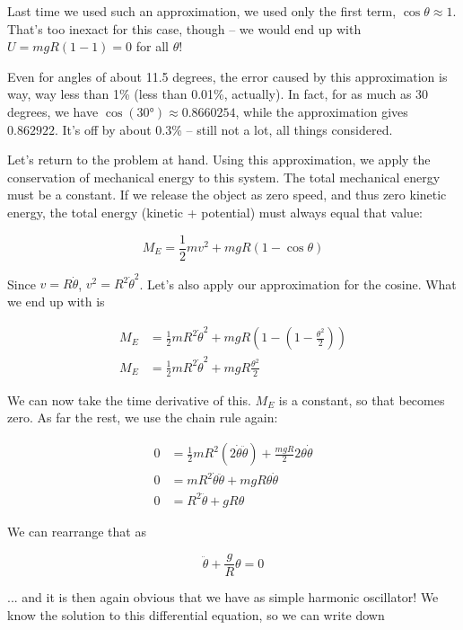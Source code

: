 Last time we used such an approximation, we used only the first term, $\cos \theta \approx 1$. That's too inexact for this case, though -- we would end up with $U = m g R (1 - 1) = 0$ for all $\theta$!

Even for angles of about 11.5 degrees, the error caused by this approximation is way, way less than 1\% (less than 0.01\%, actually). In fact, for as much as 30 degrees, we have $\cos(\ang{30}) \approx 0.8660254$, while the approximation gives $0.862922$. It's off by about 0.3\% -- still not a lot, all things considered.

Let's return to the problem at hand. Using this approximation, we apply the conservation of mechanical energy to this system. The total mechanical energy must be a constant. If we release the object as zero speed, and thus zero kinetic energy, the total energy (kinetic + potential) must always equal that value:

\begin{equation}
M_E = \frac{1}{2} m v^2 + m g R(1 - \cos \theta)
\end{equation}

Since $v = R \dot{\theta}$, $v^2 = R^2 \dot{\theta}^2$. Let's also apply our approximation for the cosine. What we end up with is

\begin{align}
M_E &= \frac{1}{2} m R^2 \dot{\theta}^2 + m g R(1 - (1 - \frac{\theta^2}{2}))\\
M_E &= \frac{1}{2} m R^2 \dot{\theta}^2 + m g R \frac{\theta^2}{2}
\end{align}

We can now take the time derivative of this. $M_E$ is a constant, so that becomes zero. As far the rest, we use the chain rule again:

\begin{align}
0 &= \frac{1}{2} m R^2 (2 \dot{\theta} \ddot{\theta}) + \frac{m g R}{2} 2 \theta \dot{\theta}\\
0 &= m R^2 \dot{\theta} \ddot{\theta} + m g R \theta \dot{\theta}\\
0 &= R^2 \ddot{\theta} + g R \theta
\end{align}

We can rearrange that as

\begin{equation}
\ddot{\theta} + \frac{g}{R} \theta = 0
\end{equation}

... and it is then again obvious that we have as simple harmonic oscillator! We know the solution to this differential equation, so we can write down

